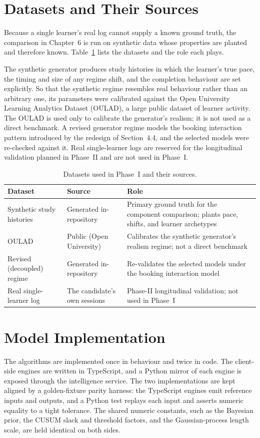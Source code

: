 \section{Datasets and Their Sources}
Because a single learner's real log cannot supply a known ground truth, the comparison in Chapter~6 is run on synthetic data whose properties are planted and therefore known. Table~\ref{tab:datasets} lists the datasets and the role each plays.

The synthetic generator produces study histories in which the learner's true pace, the timing and size of any regime shift, and the completion behaviour are set explicitly. So that the synthetic regime resembles real behaviour rather than an arbitrary one, its parameters were calibrated against the Open University Learning Analytics Dataset (OULAD), a large public dataset of learner activity. The OULAD is used only to calibrate the generator's realism; it is not used as a direct benchmark. A revised generator regime models the booking interaction pattern introduced by the redesign of Section~4.4, and the selected models were re-checked against it. Real single-learner logs are reserved for the longitudinal validation planned in Phase~II and are not used in Phase~I.

\begin{table}[htbp]
\centering
\footnotesize
\caption{Datasets used in Phase~I and their sources.}
\label{tab:datasets}
\begin{tabular}{p{3.6cm} p{3.8cm} p{5.0cm}}
\toprule
\textbf{Dataset} & \textbf{Source} & \textbf{Role} \\
\midrule
Synthetic study histories & Generated in-repository & Primary ground truth for the component comparison; plants pace, shifts, and learner archetypes \\
OULAD & Public (Open University) & Calibrates the synthetic generator's realism regime; not a direct benchmark \\
Revised (decoupled) regime & Generated in-repository & Re-validates the selected models under the booking interaction model \\
Real single-learner log & The candidate's own sessions & Phase-II longitudinal validation; not used in Phase~I \\
\bottomrule
\end{tabular}
\end{table}

\section{Model Implementation}
The algorithms are implemented once in behaviour and twice in code. The client-side engines are written in TypeScript, and a Python mirror of each engine is exposed through the intelligence service. The two implementations are kept aligned by a golden-fixture parity harness: the TypeScript engines emit reference inputs and outputs, and a Python test replays each input and asserts numeric equality to a tight tolerance. The shared numeric constants, such as the Bayesian prior, the CUSUM slack and threshold factors, and the Gaussian-process length scale, are held identical on both sides.

